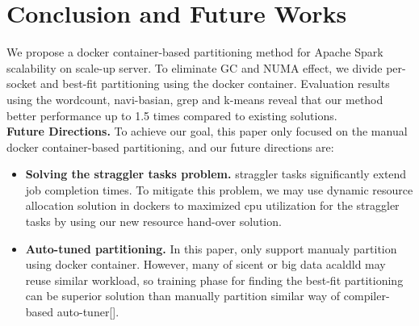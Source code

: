 \section{Conclusion and Future Works}

\ifkor
We propose a docker container-based partitioning method for Apache
Spark scalability on scale-up server.
To eliminate GC and NUMA effect, we divide per-socket and best-fit partitioning
using the docker container.
Evaluation results using the wordcount, navi-basian, grep and k-means reveal
that our method better performance up to 1.5 times compared to existing
solutions.
\newline\\
\noindent
\textbf{Future Directions.} 
To achieve our goal, this paper only focused on the manual docker
container-based partitioning, and our future directions are:
\begin{itemize}
\item \textbf{Solving the straggler tasks problem.} straggler tasks
significantly extend job completion times.
To mitigate this problem, we may use dynamic resource allocation solution in
dockers to maximized cpu utilization for the straggler tasks by using our new
resource hand-over solution.
\item \textbf{Auto-tuned partitioning.} In this paper, only support manualy
partition using docker container. However, many of sicent or big data acaldld
may reuse similar workload, so training phase for finding the best-fit
partitioning can be superior solution than manually partition similar way of
compiler-based auto-tuner[].

\end{itemize}

\else

\fi
